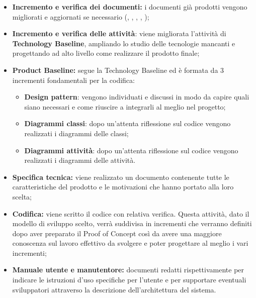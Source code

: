 \begin{itemize}
    \item \textbf{Incremento e verifica dei documenti:} i documenti già prodotti vengono migliorati e aggiornati se necessario ({\NdP}, {\PdP}, {\Glossario}, {\PdQ}, {\AdR});
    \item \textbf{Incremento e verifica delle attività}: viene migliorata l'attività di \textbf{Technology Baseline}, ampliando lo studio delle tecnologie mancanti e progettando ad alto livello come realizzare il prodotto finale;
    \item \textbf{Product Baseline:} segue la Technology Baseline ed è formata da 3 incrementi fondamentali per la codifica:
        \begin{itemize}
            \item \textbf{Design pattern}: vengono individuati e discussi in modo da capire quali siano necessari e come riuscire a integrarli al meglio nel progetto;
            \item \textbf{Diagrammi classi}: dopo un'attenta riflessione sul codice vengono realizzati i diagrammi delle classi;
            \item \textbf{Diagrammi attività}: dopo un'attenta riflessione sul codice vengono realizzati i diagrammi delle attività. 
        \end{itemize} 
    \item \textbf{Specifica tecnica:} viene realizzato un documento contenente tutte le caratteristiche del prodotto e le motivazioni che hanno portato alla loro scelta;
    \item \textbf{Codifica:} viene scritto il codice con relativa verifica. Questa attività, dato il modello di sviluppo scelto, verrà suddivisa in incrementi che verranno definiti dopo aver preparato il Proof of Concept così da avere una maggiore conoscenza sul lavoro effettivo da svolgere e poter progettare al meglio i vari incrementi;
    \item \textbf{Manuale utente e manutentore:} documenti redatti rispettivamente per indicare le istruzioni d'uso specifiche per l'utente e per supportare eventuali sviluppatori attraverso la descrizione dell'architettura del sistema.
\end{itemize}
\newpage
